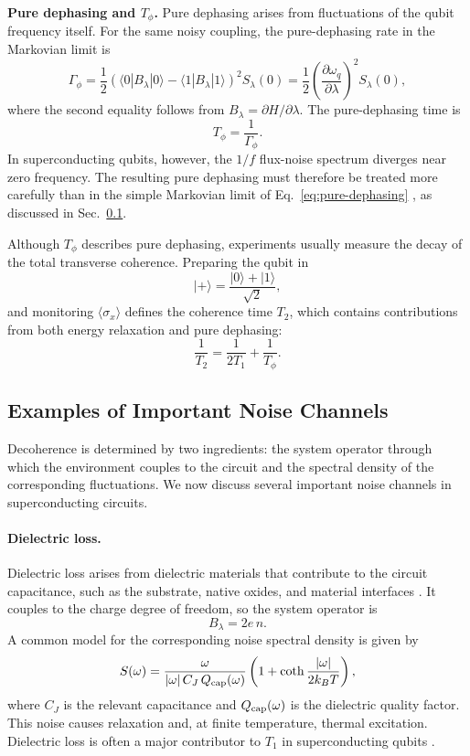 \noindent\textbf{Pure dephasing and \(T_\phi\).}
Pure dephasing arises from fluctuations of the qubit frequency itself. For the same noisy coupling, the pure-dephasing rate in the Markovian limit is \cite{RevModPhys.82.1155}
\begin{equation}
    \label{eq:pure-dephasing}
    \Gamma_{\phi}
    =
    \frac{1}{2}
    \left(
    \langle 0|B_\lambda|0\rangle
    -
    \langle 1|B_\lambda|1\rangle
    \right)^2
    S_\lambda(0)
    =
    \frac{1}{2}
    \left(
    \frac{\partial \omega_q}{\partial \lambda}
    \right)^2
    S_\lambda(0),
\end{equation}
where the second equality follows from \(B_\lambda = \partial H/\partial \lambda\). The pure-dephasing time is
\begin{equation}
    T_\phi = \frac{1}{\Gamma_\phi}.
\end{equation}
In superconducting qubits, however, the \(1/f\) flux-noise spectrum diverges near zero frequency. The resulting pure dephasing must therefore be treated more carefully than in the simple Markovian limit of Eq.~\eqref{eq:pure-dephasing} \cite{groszkowski2018coherence}, as discussed in Sec.\ \ref{subsec:noise-channels}.

Although \(T_\phi\) describes pure dephasing, experiments usually measure the decay of the total transverse coherence. Preparing the qubit in
\[
|+\rangle=\frac{|0\rangle+|1\rangle}{\sqrt{2}},
\]
and monitoring \(\langle \sigma_x\rangle\) defines the coherence time \(T_2\), which contains contributions from both energy relaxation and pure dephasing:
\begin{equation}
    \frac{1}{T_2}=\frac{1}{2T_1}+\frac{1}{T_\phi}.
\end{equation}

\subsection{Examples of Important Noise Channels}
\label{subsec:noise-channels}

Decoherence is determined by two ingredients: the system operator through which the environment couples to the circuit and the spectral density of the corresponding fluctuations. We now discuss several important noise channels in superconducting circuits.

\paragraph{Dielectric loss.}
Dielectric loss arises from dielectric materials that contribute to the circuit capacitance, such as the substrate, native oxides, and material interfaces \cite{martinis2005decoherence}. It couples to the charge degree of freedom, so the system operator is
\[
B_\lambda = 2e\,n.
\]
A common model for the corresponding noise spectral density is given by \cite{Smith2020,Nguyen2019}
\[
S(\omega)=\frac{\omega}{|\omega|\,C_J\,Q_{\rm cap}(\omega)}
\left(1+\coth\frac{|\omega|}{2k_B T}\right),
\]
where \(C_J\) is the relevant capacitance and \(Q_{\rm cap}(\omega)\) is the dielectric quality factor. This noise causes relaxation and, at finite temperature, thermal excitation. Dielectric loss is often a major contributor to \(T_1\) in superconducting qubits \cite{Murray2021dielec}.

